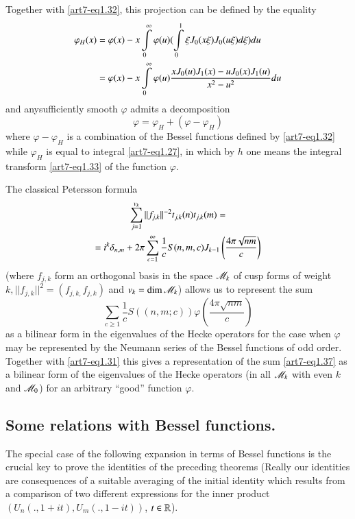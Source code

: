 Together with \eqref{art7-eq1.32}, this projection can be defined by the equality
\begin{align}
\varphi_H (x) & = \varphi (x) - x \int\limits^\infty_0 \varphi (u) (\int\limits^1_0 \xi J_0 (x\xi) J_0 (u \xi) d \xi) du \label{art7-eq1.34}\\
& = \varphi (x) - x \int\limits^\infty_0 \varphi (u) \frac{x J_0 (u) J_1 (x) - u J_0 (x) J_1 (u)}{x^2 - u^2} du \notag
\end{align}
and any\pageoriginale sufficiently smooth $\varphi$ admits a decomposition
\begin{equation}
\varphi =\varphi_H + (\varphi - \varphi_H)\label{art7-eq1.35} 
\end{equation}
where $\varphi - \varphi_H$ is a combination of the Bessel functions defined by \eqref{art7-eq1.32} while $\varphi_H$ is equal to integral \eqref{art7-eq1.27}, in which by $h$ one means the integral transform \eqref{art7-eq1.33} of the function $\varphi$.

The classical Petersson formula
\begin{gather}
\sum\limits^{v_k}_{j=1} ||f_{j,k}||^{-2} t_{j,k} (n) t_{j,k} (m) = \label{art7-eq1.36}\\
= i^k \delta_{n,m} + 2 \pi \sum\limits^\infty_{c =1} \frac{1}{c} S (n, m, c) J_{k-1} \left(\frac{4\pi \sqrt{nm}}{c} \right) \notag
\end{gather}
(where $f_{j,k}$ form an orthogonal basis in the space $\mathscr{M}_k$ of cusp forms of weight $k, ||f_{j,k}||^2 = (f_{j,k,} f_{j,k})$ and $v_k = \dim \mathscr{M}_k$) allows us to represent the sum
\begin{equation}
\sum\limits_{c \geqslant 1} \frac{1}{c} S ((n, m; c)) \varphi \left(\frac{4\pi \sqrt{nm}}{c} \right)\label{art7-eq1.37} 
\end{equation}
as a bilinear form in the eigenvalues of the Hecke operators for the case when $\varphi$ may be represented by the Neumann series of the Bessel functions  of odd order. Together with \eqref{art7-eq1.31} this gives a representation of the sum \eqref{art7-eq1.37} as a bilinear form of the eigenvalues of the Hecke operators (in all $\mathscr{M}_k$ with even $k$ and $\mathscr{M}_0$) for an arbitrary ``good'' function $\varphi$.


\subsection{Some relations with Bessel functions.}\label{art7-subsec1.6}
The special case of the following expansion in terms of Bessel functions is the crucial key to prove the identities of the preceding theorems (Really our identities are consequences of a  suitable averaging of the initial identity which results from a comparison of two different expressions for the inner product $(U_n (., 1+ it), U_m (., 1 - it))$, $t \in \mathbb{R}$).

